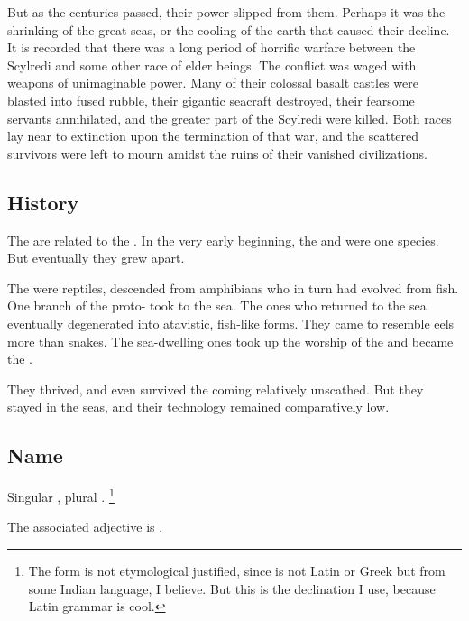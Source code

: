 {{    But as the centuries passed, their power slipped from them. Perhaps it was the shrinking of the great
    seas, or the cooling of the earth that caused their decline. It is recorded that there was a long period of
    horrific warfare between the Scylredi and some other race of elder beings. The conflict was waged with
    weapons of unimaginable power. Many of their colossal basalt castles were blasted into fused rubble,
    their gigantic seacraft destroyed, their fearsome servants annihilated, and the greater part of the Scylredi
    were killed. Both races lay near to extinction upon the termination of that war, and the scattered survivors
    were left to mourn amidst the ruins of their vanished civilizations.}
}








\subsection{History}
The \nagae{} are related to the . 
In the very early beginning, the \ophidians{} and \nagae{} were one species. 
But eventually they grew apart. 

The \ophidians{} were reptiles, descended from amphibians who in turn had evolved from fish. 
One branch of the proto-\ophidians{} took to the sea. 
The ones who returned to the sea eventually degenerated into atavistic, fish-like forms. 
They came to resemble eels more than snakes. 
The sea-dwelling ones took up the worship of the \Krakens{} and became the \nagae{}.  

They thrived, and even survived the coming \firstbanewar{} relatively unscathed. 
But they stayed in the seas, and their technology remained comparatively low.








\subsection{Name}
Singular \emph{\naga{}}, plural \emph{\nagae{}}.%
\footnote{%
  The form \quo{\nagae} is not etymological justified, since \quo{\naga} is not Latin or Greek but from some Indian language, I believe. But this is the declination I use, because Latin grammar is cool.} 

The associated adjective is \emph{\naga{}}. 

